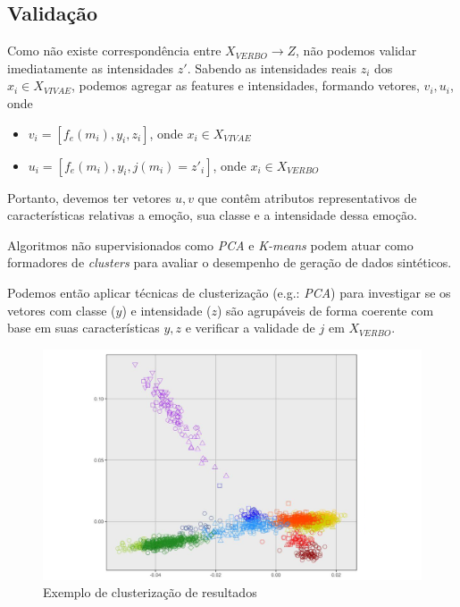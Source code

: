 
\subsection{Validação}

Como não existe correspondência entre $X_{VERBO} \rightarrow Z$, não podemos validar imediatamente as intensidades $z'$. Sabendo as intensidades reais $z_i$ dos $x_i \in X_{VIVAE}$, podemos agregar as features e intensidades, formando vetores, $v_i, u_i$, onde

\begin{itemize}
    \item $v_i = [f_e(m_i), y_i, z_i]$, onde $x_i \in X_{VIVAE}$
    \item $u_i = [f_e(m_i), y_i, j(m_i) = z'_i]$, onde $x_i \in X_{VERBO}$
\end{itemize}

Portanto, devemos ter vetores $u,v$ que contêm atributos representativos de características relativas a emoção, sua classe e a intensidade dessa emoção.

Algoritmos não supervisionados como \textit{PCA} e \textit{K-means} podem atuar como formadores de \textit{clusters} para avaliar o desempenho de geração de dados sintéticos.

Podemos então aplicar técnicas de clusterização (e.g.: \textit{PCA}) para investigar se os vetores com classe ($y$) e intensidade ($z$) são agrupáveis de forma coerente com base em suas características $y, z$ e verificar a validade de $j$ em $X_{VERBO}$.


\begin{figure}[!h]
\centering
\includegraphics[width=1.0\textwidth]{imagens/p-naosupervisionado.png}
\caption{\label{fig:clusterizacaoresults}Exemplo de clusterização de resultados}
\end{figure}

